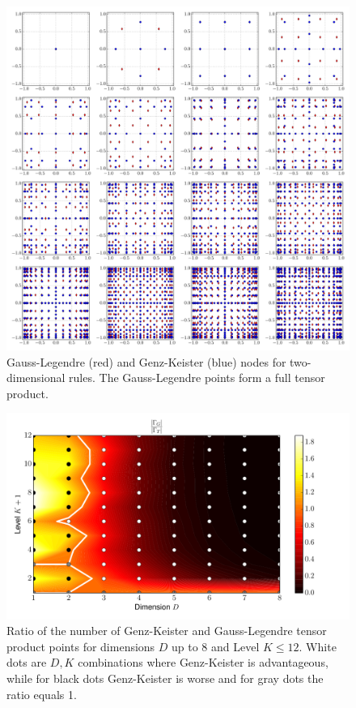 \documentclass[a4paper,10pt]{article}
\begin{document}
\begin{figure}
  \centering
  \includegraphics[width=\linewidth]{./img/gk_legendre_nodes_2d.pdf}
  \caption{Gauss-Legendre (red) and Genz-Keister (blue) nodes for
  two-dimensional rules. The Gauss-Legendre points form a full tensor
  product.}
  \label{fig:gk_legendre_nodes_2d}
\end{figure}

\begin{figure}
  \centering
  \includegraphics[width=0.8\linewidth]{./img/gk_legendre_ratio.pdf}
  \caption{Ratio of the number of Genz-Keister and Gauss-Legendre tensor product
  points for dimensions $D$ up to 8 and Level $K \leq 12$. White dots are $D,K$
  combinations where Genz-Keister is advantageous, while for black dots
  Genz-Keister is worse and for gray dots the ratio equals 1.}
  \label{fig:gk_legendre_ratio}
\end{figure}
\end{document}
